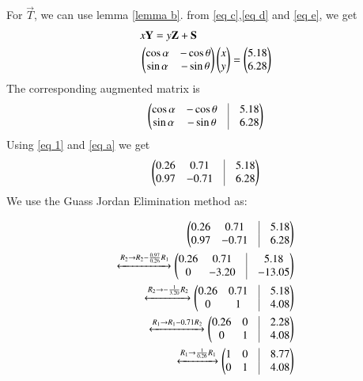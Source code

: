 \documentclass[journal,12pt,twocolumn]{IEEEtran}
\begin{document}
For $\vec{T}$, we can use lemma \ref{lemma b}. from \eqref{eq c},\eqref{eq d} and \eqref{eq e}, we get
\begin{align}
&x\mathbf{Y} = y\mathbf{Z}+\mathbf{S}\\
&\begin{pmatrix}\cos\alpha & -\cos\theta \\ \sin\alpha & -\sin\theta\end{pmatrix} \begin{pmatrix}x \\ y\end{pmatrix} = \begin{pmatrix}5.18\\6.28\end{pmatrix}
\end{align}
The corresponding augmented matrix is 
\begin{align}
		\myvec{
		\cos\alpha & -\cos\theta & \vrule & 5.18 \\
		\sin\alpha & -\sin\theta & \vrule & 6.28 \\
	}
\end{align}
Using \eqref{eq 1} and \eqref{eq a} we get
\begin{align}
		\myvec{
		0.26 & 0.71 & \vrule & 5.18 \\
		0.97 & -0.71 & \vrule & 6.28 \\
	}
\end{align}
We use the Guass Jordan Elimination method as:

\begin{align}
	\myvec{
		0.26 & 0.71 & \vrule & 5.18 \\
		0.97 & -0.71 & \vrule & 6.28 \\
	}
	\\
	\xleftrightarrow[]{R_2 \rightarrow R_2 - \frac{0.97}{0.26}R_1}
	\myvec{
		0.26 & 0.71 & \vrule & 5.18 \\
		0 & -3.20 & \vrule & -13.05 \\
	}
	\\
	\xleftrightarrow[]{R_2\rightarrow -\frac{1}{3.20}R_2}
	\myvec{
		0.26 & 0.71 & \vrule & 5.18 \\
		0 & 1 & \vrule & 4.08 \\
	}
	\\
	\xleftrightarrow[]{R_1 \rightarrow R_1 - 0.71 R_2}
	\myvec{
		0.26 & 0 & \vrule & 2.28 \\
		0 & 1 & \vrule & 4.08 \\
	}
	\\
	\xleftrightarrow[]{R_1 \rightarrow \frac{1}{0.26}R_1}
	\myvec{
		1 & 0 & \vrule & 8.77 \\
		0 & 1 & \vrule & 4.08 \\
	}
\end{align}
\end{document}
